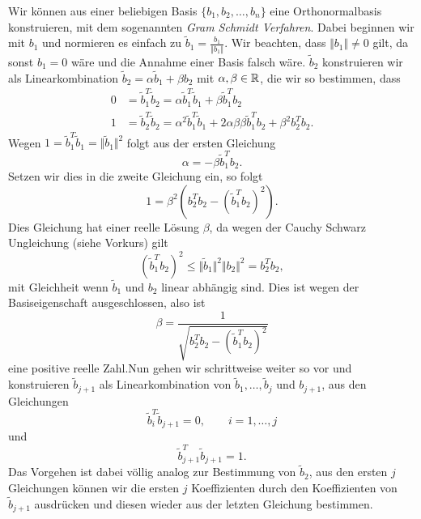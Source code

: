 Wir können aus einer beliebigen Basis \(\{b_1,b_2, \ldots,b_n\}\) eine Orthonormalbasis konstruieren, mit dem sogenannten \emph{Gram Schmidt Verfahren}. Dabei beginnen wir mit \(b_1\) und normieren es einfach zu \(\tilde b_1 = \frac{b_1}{\Vert b_1\Vert}\). Wir beachten, dass \(\Vert b_1\Vert \neq 0\) gilt, da sonst \(b_1=0\) wäre und die Annahme einer Basis falsch wäre. \(\tilde b_2\) konstruieren wir als Linearkombination \(\tilde b_2 = \alpha \tilde b_1 + \beta b_2\) mit \(\alpha, \beta \in \mathbb{R}\), die wir so bestimmen, dass
\begin{align*}
0 &=  \tilde b_1^T \tilde b_2 = \alpha \tilde b_1^T \tilde b_1 + \beta \tilde b_1^T b_2\\
1 &=  \tilde b_2^T \tilde b_2 = \alpha^2 \tilde b_1^T \tilde b_1 + 2 \alpha \beta \beta \tilde b_1^T b_2 + \beta^2 b_2^T b_2.
\end{align*}
Wegen \(1 = \tilde b_1^T \tilde b_1 = \Vert \tilde b_1 \Vert^2\) folgt aus der ersten Gleichung
\begin{equation*}
 \alpha = - \beta \tilde b_1^T b_2.
\end{equation*}
Setzen wir dies in die zweite Gleichung ein, so folgt
\begin{equation*}
 1 = \beta^2 ( b_2^T b_2 - (\tilde b_1^T b_2)^2).
\end{equation*}
Dies Gleichung hat einer reelle Lösung \(\beta\), da wegen der Cauchy Schwarz Ungleichung (siehe Vorkurs) gilt
\begin{equation*}
 (\tilde b_1^T b_2)^2 \leq \Vert \tilde b_1 \Vert^2 \Vert b_2 \Vert^2 =  b_2^T b_2 ,
\end{equation*}
mit Gleichheit wenn \(\tilde b_1\) und \(b_2\) linear abhängig sind. Dies ist wegen der Basiseigenschaft ausgeschlossen, also ist
\begin{equation*}
 \beta = \frac{1}{\sqrt{b_2^T b_2 - (\tilde b_1^T b_2)^2}}\end{equation*}
eine positive reelle Zahl.Nun gehen wir schrittweise weiter so vor und konstruieren \(\tilde b_{j+1}\) als Linearkombination von \(\tilde b_1, \ldots, \tilde b_j\) und \(b_{j+1}\), aus den Gleichungen
\begin{equation*}
 \tilde b_i^T \tilde b_{j+1} = 0, \qquad i=1,\ldots,j
\end{equation*}
und
\begin{equation*}
 \tilde b_{j+1}^T \tilde b_{j+1} = 1.
\end{equation*}
Das Vorgehen ist dabei völlig analog zur Bestimmung von \(\tilde b_2\), aus den ersten \(j\) Gleichungen können wir die ersten \(j\) Koeffizienten durch den Koeffizienten von \(\tilde b_{j+1}\) ausdrücken und diesen wieder aus der letzten Gleichung bestimmen.
